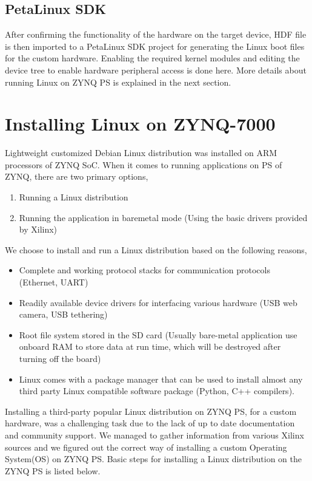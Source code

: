 \documentclass[12pt,a4paper]{report}
\begin{document}
\subsection{PetaLinux SDK}
After confirming the functionality of the hardware on the target device, HDF file is then imported to a PetaLinux SDK project for generating the Linux boot files for the custom hardware. Enabling the required kernel modules and editing the device tree to enable hardware peripheral access is done here. More details about running Linux on ZYNQ PS is explained in the next section.

\section{Installing Linux on ZYNQ-7000}
Lightweight customized Debian Linux distribution was installed on ARM processors of ZYNQ SoC. When it comes to running applications on PS of ZYNQ, there are two primary options,

\begin{enumerate}
\item Running a Linux distribution 
\item Running the application in baremetal mode (Using the basic drivers provided by Xilinx)
\end{enumerate}

\noindent We choose to install and run a Linux distribution based on the following reasons,
\begin{itemize}
\item Complete and working protocol stacks for communication protocols (Ethernet, UART)
\item Readily available device drivers for interfacing various hardware (USB web camera, USB tethering)
\item Root file system stored in the SD card (Usually bare-metal application use onboard RAM to store data at run time, which will be destroyed after turning off the board)
\item Linux comes with a package manager that can be used to install almost any third party Linux compatible software package (Python, C++ compilers).
\end{itemize}

Installing a third-party popular Linux distribution on ZYNQ PS, for a custom hardware, was a challenging task due to the lack of up to date documentation and community support.  We managed to gather information from various Xilinx sources and we figured out the correct way of installing a custom Operating System(OS) on ZYNQ PS. Basic steps for installing a Linux distribution on the ZYNQ PS is listed below.
\end{document}
